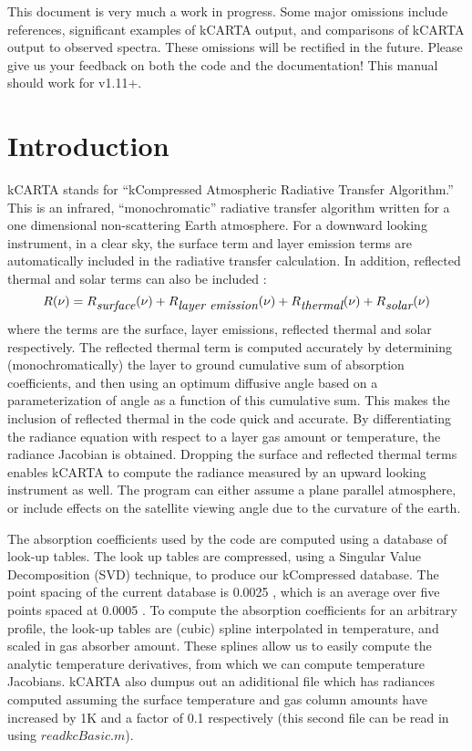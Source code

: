 \documentclass[12pt]{article}
\newcommand{\kc}{\textsf{kCARTA}\xspace}
\begin{document}
This document is very much a work in progress.  Some major omissions
include references, significant examples of \kc output, and
comparisons of \kc output to observed spectra.  These omissions will
be rectified in the future.  Please give us your feedback on both the
code and the documentation!  This manual should work for v1.11+.

\newpage
\section{Introduction}

\kc stands for ``kCompressed Atmospheric Radiative Transfer
Algorithm.''  This is an infrared, ``monochromatic'' radiative
transfer algorithm written for a one dimensional non-scattering Earth
atmosphere.  For a downward looking instrument, in a clear sky, 
the surface term and layer emission terms are automatically included in the 
radiative transfer calculation.  In addition, reflected thermal and solar 
terms can also be included :
\begin{equation}
R(\nu) = R_{\hbox{\it surface}}(\nu) + R_{\hbox{\it layer emission}}(\nu) + 
R_{\hbox{\it thermal}}(\nu) + R_{\hbox{\it solar}}(\nu)
\end{equation}
where the terms are the surface, layer emissions, reflected thermal
and solar respectively.  The reflected thermal term is computed
accurately by determining (monochromatically) the layer to ground
cumulative sum of absorption coefficients, and then using an optimum
diffusive angle based on a parameterization of angle as a function of
this cumulative sum.  This makes the inclusion of reflected thermal in
the code quick and accurate.   By differentiating the radiance equation
with respect to a layer gas amount or temperature, the radiance
Jacobian is obtained.  Dropping the surface and reflected thermal terms
enables \kc to compute the radiance measured by an upward looking
instrument as well.  The program can either assume a plane parallel
atmosphere, or include effects on the satellite viewing angle due to
the curvature of the earth.

The absorption coefficients used by the code are computed using a
database of look-up tables.  The look up tables are compressed, using
a Singular Value Decomposition ({\sf SVD}) technique, to produce our
{\sf kCompressed} database.  The point spacing of the current database is
0.0025 \wn, which is an average over five points spaced at 0.0005
\wn.  To compute the absorption coefficients for an arbitrary
profile, the look-up tables are (cubic) spline interpolated in
temperature, and scaled in gas absorber amount.  These splines allow
us to easily compute the analytic temperature derivatives, from
which we can compute temperature Jacobians. \kc also dumpus out an adiditional
file which has radiances computed assuming the surface temperature and 
gas column amounts have increased by 1K and a factor of 0.1 respectively
(this second file can be read in using $readkcBasic.m$).
\end{document}
